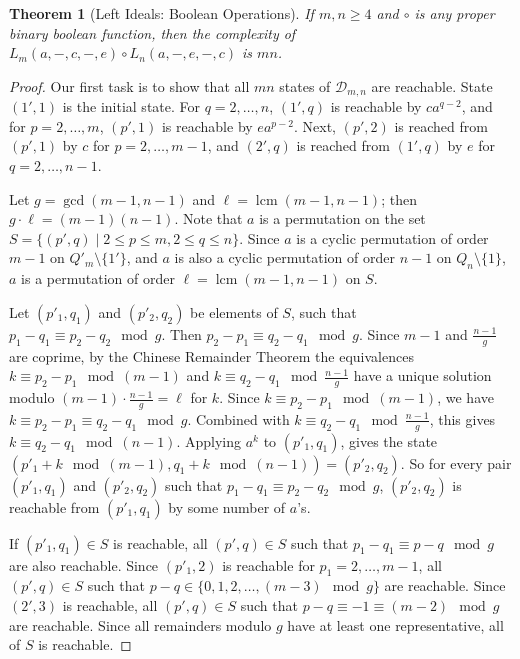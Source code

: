 \documentclass[final]{dmtcs-episciences}
\renewcommand{\le}{\leqslant}
\renewcommand{\ge}{\geqslant}
\newcommand{\cD}{{\mathcal D}}
\newtheorem{theorem}{Theorem}
\theoremstyle{definition}
\theoremstyle{remark}
\DeclareMathOperator{\lcm}{lcm}
\begin{document}
\begin{theorem}[Left Ideals: Boolean Operations]
\label{thm:LBool}
If $m,n\ge 4$ and $\circ$ is any proper binary boolean function, then
the complexity of $L_m(a,-,c,-,e) \circ L_n(a,-,e,-,c)$ is $mn$.
\end{theorem}
\begin{proof}
Our first task is to show that all $mn$ states of $\cD_{m,n}$ are reachable.
State $(1',1)$ is the initial state. For $q=2,\dots,n$,  $(1',q)$ is reachable by $ca^{q-2}$, and for $p=2,\dots,m$, $(p',1)$ is reachable by $ea^{p-2}$.
Next,  $(p',2)$ is reached from $(p',1)$ by $c$ for $p=2,\dots, m-1$, and 
$(2',q)$ is reached from $(1',q)$ by $e$ for $q=2,\dots,n-1$.

Let $g=\gcd(m-1,n-1)$ and $\ell=\lcm(m-1,n-1)$; then $g\cdot \ell=(m-1)(n-1)$.
Note that $a$ is a permutation on the set $S=\{(p',q) \mid 2\le p\le m, 2\le q\le n\}$. Since $a$ is a cyclic permutation of order $m-1$ on $Q'_{m}\setminus\{1'\}$, and $a$ is also a cyclic permutation of order $n-1$ on $Q_{n}\setminus\{1\}$,  $a$ is a permutation of order $\ell =\lcm(m-1,n-1)$ on $S$.

Let $(p'_1,q_1)$ and $(p'_2,q_2)$ be elements of $S$, such that $p_1-q_1\equiv p_2-q_2 \mod g$. Then $p_2-p_1\equiv q_2-q_1\mod g$. 
Since $m-1$ and  $\frac{n-1}{g}$
are coprime,  by the Chinese Remainder Theorem the equivalences $k\equiv p_2-p_1\mod(m-1)$ and $ k\equiv q_2-q_1\mod \frac{n-1}{g}$ have a unique solution modulo $(m-1)\cdot\frac{n-1}{g}=\ell$ for $k$. 
Since $k\equiv p_2-p_1 \mod(m-1)$,  we have  $k\equiv p_2-p_1\equiv q_2-q_1\mod g$. Combined with $ k\equiv q_2-q_1\mod\frac{n-1}{g}$, this gives $k\equiv q_2-q_1\mod(n-1)$. Applying  $a^k$ to $(p'_1,q_1)$, gives the state $(p'_1+k\mod(m-1),q_1+k\mod(n-1))=(p'_2,q_2)$. 
So for every pair $(p'_1,q_1)$ and $(p'_2,q_2)$ such that $p_1-q_1\equiv p_2-q_2\mod g$,  $(p'_2,q_2)$  is reachable from  $(p'_1,q_1)$ by  some number of $a$'s.

If   $(p'_1,q_1)\in S$ is reachable,  all $(p',q)\in S$ such that $p_1-q_1\equiv p - q \mod g$  are also reachable. 
Since  $(p'_1,2)$ is reachable for $p_1=2,\dots,m-1$,  all $(p', q )\in S$ such that $p -q \in\{0,1,2,\dots,(m-3)\mod g\}$ are  reachable. 
Since $(2',3)$ is reachable, all $(p',q)\in S$ such that $p-q\equiv-1\equiv(m-2)\mod g$ are reachable. Since all remainders modulo $g$  have  at least one representative, all of $S$ is reachable.


\end{proof}
\end{document}
